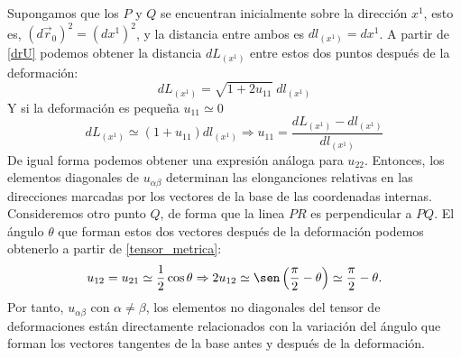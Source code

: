  Supongamos que los $P$ y $Q$ se encuentran
inicialmente sobre la dirección $x^1$, esto es, $(d\vec{r}_0)^2=(dx^1)^2$, y
la distancia entre ambos es $dl_{(x^1)}=dx^1$. A
partir de \eqref{drU} podemos obtener la distancia $dL_{(x^1)}$ entre estos
dos puntos después de la deformación:
\begin{equation*}
dL_{(x^1)}=\sqrt{1+2u_{11}}\;dl_{(x^1)}
\end{equation*}
Y si la deformación es pequeña $u_{11}\simeq 0$
\begin{equation*}
dL_{(x^1)}\simeq (1+u_{11}) dl_{(x^1)} \Rightarrow u_{11}=\frac{dL_{(x^1)}-dl_{(x^1)}}{dl_{(x^1)}}
\end{equation*}
De igual forma podemos obtener una expresión análoga para $u_{22}$. Entonces,
los elementos diagonales de $u_{\alpha\beta}$ determinan las elonganciones
relativas en las direcciones marcadas por los vectores de la base de las
coordenadas internas. Consideremos otro punto $Q$, de forma que la linea $PR$
es perpendicular a $PQ$. El ángulo $\theta$ que forman estos dos vectores
después de la deformación podemos obtenerlo a partir de
\eqref{tensor_metrica}:
\begin{equation*}
u_{12}=u_{21}\simeq \frac{1}{2}\cos \theta \Rightarrow 2u_{12}\simeq\sen \left(\frac{\pi}{2}-\theta\right)\simeq \frac{\pi}{2}-\theta.
\end{equation*}
Por tanto, $u_{\alpha\beta}$ con $\alpha\neq\beta$, los elementos no
diagonales del tensor de deformaciones están directamente relacionados con la
variación del ángulo que forman los vectores tangentes de la base antes y
después de la deformación.

